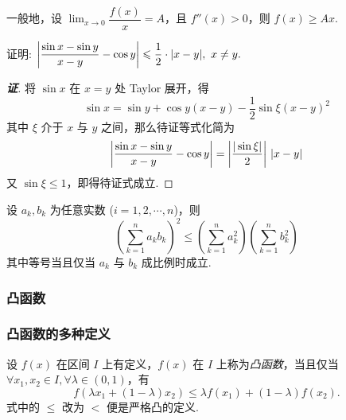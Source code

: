 \begin{inference}
    一般地，设 $\displaystyle\lim_{x\to0}\dfrac{f(x)}{x}=A$，且 $f''(x)>0$，则 $f(x)\geqslant Ax.$
\end{inference}

\begin{example}
    证明: $\qty|\dfrac{\sin x-\sin y}{x-y}-\cos y|\leqslant \dfrac{1}{2}\cdot |x-y|,~x\neq y.$
\end{example}
\begin{proof}[{\songti \textbf{证}}]
    将 $\sin x$ 在 $x=y$ 处 Taylor 展开，得 $$\sin x=\sin y+\cos y(x-y)-\dfrac{1}{2}\sin \xi(x-y)^2$$
    其中 $\xi$ 介于 $x$ 与 $y$ 之间，那么待证等式化简为 $$\qty|\dfrac{\sin x-\sin y}{x-y}-\cos y|=\qty|\dfrac{|\sin\xi|}{2}|~|x-y|$$
    又 $\sin \xi\leqslant 1$，即得待证式成立.
\end{proof}

\begin{theorem}
    设 $a_k,b_k$ 为任意实数 ($i=1,2,\cdots,n$)，则
    $$\displaystyle\left( \sum_{k=1}^n a_k b_k \right)^{\!\!2}\leqslant\left( \sum_{k=1}^n a_k^2 \right) \left( \sum_{k=1}^n b_k^2 \right) $$
    其中等号当且仅当 $a_k$ 与 $b_k$ 成比例时成立.
\end{theorem}

\subsubsection{凸函数}

\subsubsection{凸函数的多种定义}

\begin{definition}[凸函数 A]
    设 $ f(x) $ 在区间 $ I $ 上有定义，$f(x) $ 在 $ I $ 上称为\textit{凸函数}，当且仅当 $ \forall x_{1} ,  x_{2} \in I, \forall \lambda \in(0,1)$，有
    $$f\left(\lambda x_{1}+(1-\lambda) x_{2}\right) \leqslant \lambda f\left(x_{1}\right)+(1-\lambda) f\left(x_{2}\right) .$$
    式中的 $\leqslant$ 改为 $<$ 便是严格凸的定义.
\end{definition}

